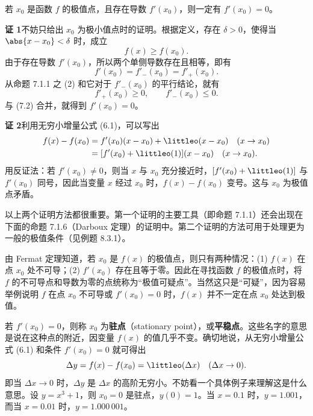 \begin{xproposition}[7.1.2（Fermat 定理）]
若 $x_0$ 是函数 $f$ 的极值点，且存在导数 $f'(x_0)$，则一定有 $f'(x_0)=0$。
\end{xproposition}
\begin{xproof}
\textbf{证 1}\quad 不妨只给出 $x_0$ 为极小值点时的证明。根据定义，存在 $\delta>0$，使得当 $\abs{x-x_0}<\delta$ 时，成立
\begin{equation}
  f(x)\geqslant f(x_0).
  \tag{7.1}
\end{equation}
由于存在导数 $f'(x_0)$，所以两个单侧导数存在且相等，即有
\begin{equation}
  f'(x_0)=f'_-(x_0)=f'_+(x_0).
  \tag{7.2}
\end{equation}
从命题 7.1.1 之 (2) 和它对于 $f'_-(x_0)$ 的平行结论，就有
\[
  f'_+(x_0)\geqslant0,\qquad f'_-(x_0)\leqslant0.
\]
与 (7.2) 合并，就得到 $f'(x_0)=0$。

\textbf{证 2}\quad 利用无穷小增量公式 (6.1)，可以写出
\[
  \begin{aligned}
    f(x)-f(x_0)&=f'(x_0)(x-x_0)+\littleo(x-x_0)\quad(x\to x_0)\\
    &=[f'(x_0)+\littleo(1)](x-x_0)\quad(x\to x_0).
  \end{aligned}
\]
用反证法：若 $f'(x_0)\neq0$，则当 $x$ 与 $x_0$ 充分接近时，$[f'(x_0)+\littleo(1)]$ 与 $f'(x_0)$ 同号，因此当变量 $x$ 经过 $x_0$ 时，$f(x)-f(x_0)$ 变号。这与 $x_0$ 为极值点矛盾。
\end{xproof}

\begin{xremark}
以上两个证明方法都很重要。第一个证明的主要工具（即命题 7.1.1）还会出现在下面的命题 7.1.6（Darboux 定理）的证明中。第二个证明的方法可用于处理更为一般的极值条件（见例题 8.3.1）。
\end{xremark}

\begin{xremark}
由 Fermat 定理知道，若 $x_0$ 是 $f(x)$ 的极值点，则只有两种情况：(1) $f(x)$ 在点 $x_0$ 处不可导；(2) $f'(x_0)$ 存在且等于零。因此在寻找函数 $f$ 的极值点时，将 $f$ 的不可导点和导数为零的点统称为“极值可疑点”。当然这只是“可疑”，因为容易举例说明 $f$ 在点 $x_0$ 不可导或 $f'(x_0)=0$ 时，$f(x)$ 并不一定在点 $x_0$ 处达到极值。
\end{xremark}

\begin{xremark}
若 $f'(x_0)=0$，则称 $x_0$ 为\textbf{驻点}（stationary point），或\textbf{平稳点}。这些名字的意思是说在这种点的附近，因变量 $f(x)$ 的值几乎不变。确切地说，从无穷小增量公式 (6.1) 和条件 $f'(x_0)=0$ 就可得出
\[
  \Delta y=f(x)-f(x_0)=\littleo(\Delta x)\quad(\Delta x\to0).
\]
即当 $\Delta x\to0$ 时，$\Delta y$ 是 $\Delta x$ 的高阶无穷小。不妨看一个具体例子来理解这是什么意思。设 $y=x^3+1$，则 $x_0=0$ 是驻点，$y(0)=1$。当 $x=0.1$ 时，$y=1.001$，而当 $x=0.01$ 时，$y=1.000\,001$。
\end{xremark}

